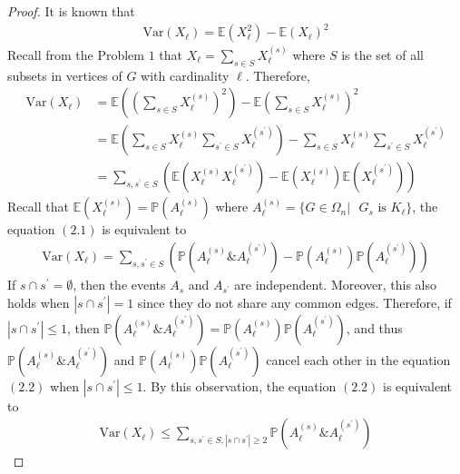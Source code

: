\begin{proof}
  It is known that
  \begin{align*}
    \text{Var}(X_{\ell}) = \mathbb{E}(X_{\ell}^{2}) - \mathbb{E}(X_{\ell})^{2}
  \end{align*}
  Recall from the Problem $1$ that $X_{\ell} = \sum\limits_{s \in S}X_{\ell}^{(s)}$ where $S$ is the set of all subsets in vertices of $G$ with cardinality $\ell$. Therefore,
  \begin{align*}
    \text{Var}(X_{\ell}) &= \mathbb{E}\left( \left(\sum\limits_{s \in S} X_{\ell}^{(s)}\right)^{2} \right) - \mathbb{E} \left( \sum\limits_{s \in S} X_{\ell}^{(s)} \right)^{2} \\
                       &= \mathbb{E} \left( \sum\limits_{s \in S} X_{\ell}^{(s)} \sum\limits_{s^{'} \in S} X_{\ell}^{(s^{'})} \right) - \sum\limits_{s \in S} X_{\ell}^{(s)} \sum\limits_{s^{'} \in S} X_{\ell}^{(s^{'})} \\
                       &= \sum\limits_{s, s^{'} \in S} \left( \mathbb{E}(X_{\ell}^{(s)} X_{\ell}^{(s^{'})}) - \mathbb{E}(X_{\ell}^{(s)}) \mathbb{E}(X_{\ell}^{(s^{'})}) \right) \tag{2.1}
  \end{align*}
  Recall that $\mathbb{E}(X_{\ell}^{(s)}) = \mathbb{P}(A_{\ell}^{(s)})$ where $A_{\ell}^{(s)} = \{G \in \Omega_{n} | \text{ $G_{s}$ is $K_{\ell}$}\}$, the equation $(2.1)$ is equivalent to
  \begin{align*}
    \text{Var}(X_{\ell})  = \sum\limits_{s, s^{'} \in S} \left( \mathbb{P}(A_{\ell}^{(s)} \& A_{\ell}^{(s^{'})}) - \mathbb{P}(A_{\ell}^{(s)}) \mathbb{P}(A_{\ell}^{(s^{'})}) \right) \tag{2.2}
  \end{align*}
  If $s \cap s^{'} = \emptyset$, then the events $A_{s}$ and $A_{s^{'}}$ are independent. Moreover, this also holds when $|s \cap s^{'}|=1$ since they do not share any common edges. Therefore, if $|s \cap s^{'}| \leq 1$, then $\mathbb{P}(A_{\ell}^{(s)} \& A_{\ell}^{(s^{'})}) = \mathbb{P}(A_{\ell}^{(s)}) \mathbb{P}(A_{\ell}^{(s^{'})})$, and thus $\mathbb{P}(A_{\ell}^{(s)} \& A_{\ell}^{(s^{'})})$ and $\mathbb{P}(A_{\ell}^{(s)}) \mathbb{P}(A_{\ell}^{(s^{'})})$ cancel each other in the equation $(2.2)$ when $|s \cap s^{'}| \leq 1$. By this observation, the equation $(2.2)$ is equivalent to
  \begin{align*}
    \text{Var}(X_{\ell}) \leq \sum\limits_{s,s^{'} \in S, |s \cap s^{'}| \geq 2} \mathbb{P} (A_{\ell}^{(s)} \& A_{\ell}^{(s^{'})}) \tag{2.3}
  \end{align*}

\end{proof}
